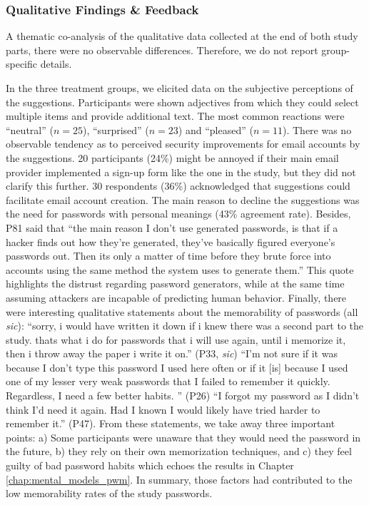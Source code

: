 \subsubsection{Qualitative Findings \& Feedback}
A thematic co-analysis of the qualitative data collected at the end of both study parts, there were no observable differences. Therefore, we do not report group-specific details.  %

In the three treatment groups, we elicited data on the subjective perceptions of the suggestions. Participants were shown adjectives from which they could select multiple items and provide additional text. The most common reactions were ``neutral'' ($n=25$), ``surprised'' ($n=23$) and ``pleased'' ($n=11$). There was no observable tendency as to perceived security improvements for email accounts by the suggestions. 20 participants (24\%) might be annoyed if their main email provider implemented a sign-up form like the one in the study, but they did not clarify this further. 30 respondents (36\%) acknowledged that suggestions could facilitate email account creation. The main reason to decline the suggestions was the need for passwords with personal meanings (43\% agreement rate). 
Besides, P81 said that ``the main reason I don't use generated passwords, is that if a hacker finds out how they're generated, they've basically figured everyone's passwords out. Then its only a matter of time before they brute force into accounts using the same method the system uses to generate them.'' This quote highlights the distrust regarding password generators, while at the same time assuming attackers are incapable of predicting human behavior.
Finally, there were interesting qualitative statements about the memorability of passwords (all \textit{sic}): ``sorry, i would have written it down if i knew there was a second part to the study. thats what i do for passwords that i will use again, until i memorize it, then i throw away the paper i write it on.'' (P33, \textit{sic}) ``I'm not sure if it was because I don't type this password I used here often or if it [is] because I used one of my lesser very weak passwords that I failed to remember it quickly. Regardless, I need a few better habits. '' (P26) ``I forgot my password as I didn't think I'd need it again. Had I known I would likely have tried harder to remember it.'' (P47). From these statements, we take away three important points: a) Some participants were unaware that they would need the password in the future, b) they rely on their own memorization techniques, and c) they feel guilty of bad password habits which echoes the results in Chapter \ref{chap:mental_models_pwm}. In summary, those factors had contributed to the low memorability rates of the study passwords. 

